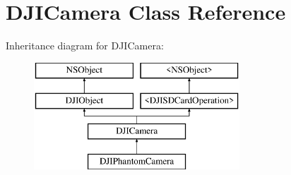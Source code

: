 \hypertarget{interface_d_j_i_camera}{\section{D\+J\+I\+Camera Class Reference}
\label{interface_d_j_i_camera}
}
Inheritance diagram for D\+J\+I\+Camera\+:\begin{figure}[H]
\begin{center}
\leavevmode
\includegraphics[height=4.000000cm]{interface_d_j_i_camera}
\end{center}
\end{figure}
